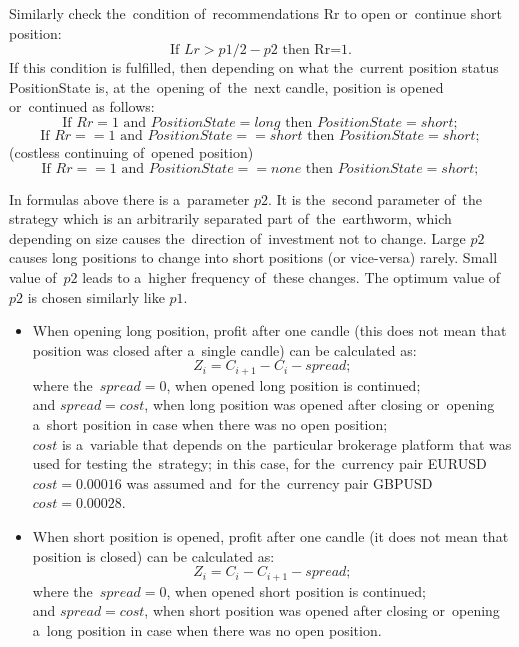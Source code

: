 \documentclass[runningheads,a4paper]{llncs}
\begin{document}
Similarly check the~condition of~recommendations Rr to open or~continue short position:
\begin{equation}
\text{If } Lr>p1/2 - p2 \text { then Rr=1.}
\end{equation}
If this condition is fulfilled, then depending on what the~current position status PositionState is, at the~opening of~the~next candle, position is opened or~continued as follows: \\
\begin{equation}
\text{If } Rr=1 \text{ and~} PositionState =long \text{ then } PositionState =short;
\end{equation}
\begin{equation}
\text{If } Rr==1 \text{ and~} PositionState ==short \text{ then } PositionState=short;
\end{equation}
(costless continuing of~opened position)
\begin{equation}
\text{If } Rr==1 \text{ and~}  PositionState ==none \text{ then }  PositionState =short;
\end{equation}

In formulas above there is a~parameter $p2$. It is the~second parameter of~the strategy which is an arbitrarily separated part of~the~earthworm, which depending on size causes the~direction of~investment not to change. Large $p2$ causes long positions to change into short positions (or vice-versa) rarely. Small value of~$p2$ leads to a~higher frequency of~these changes. The optimum value of~$p2$ is chosen similarly like $p1$.
\begin{itemize}
\item 	When opening long position, profit after one candle (this does not mean that position was closed after a~single candle) can be calculated as:
\begin{equation}
Z_i = C_{i+1} - C_i - spread;
\end{equation}
where the~$spread = 0$, when opened long position is continued; \\
and $spread = cost$, when long position was opened after closing or~opening a~short position in case when there was no open position;\\
$cost$ is a~variable that depends on the~particular brokerage platform that was used for testing the~strategy; in this case, for the~currency pair EURUSD $cost = 0.00016$ was assumed and~for the~currency pair GBPUSD $cost = 0.00028$.
\item When short position is opened, profit after one candle (it does not mean that position is closed) can be calculated as: 
\begin{equation}
Z_i = C_i-C_{i+1}- spread;
\end{equation}
where the~$spread = 0$, when opened short position is continued;\\ 
and $spread = cost$, when short position was opened after closing or~opening a~long position in case when there was no open position.
\end{itemize}
\end{document}
